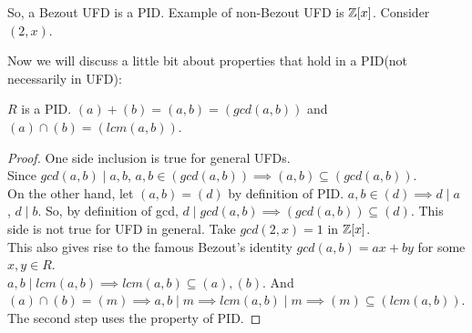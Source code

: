 So, a Bezout UFD is a PID. Example of non-Bezout UFD is $ \mathbb{Z}[x] $. Consider $ (2,x) $.

Now we will discuss a little bit about properties that hold in a PID(not necessarily in UFD):
\begin{theorem}
	$ R $ is a PID. $ (a)+(b)=(a,b)= (gcd(a,b)) $ and $ (a)\cap(b)= (lcm(a,b)) $. 
\end{theorem}
\begin{proof}
	One side inclusion is true for general UFDs.\\
	Since $ gcd(a,b)\mid a,b $, $ a,b\in (gcd(a,b)) \implies (a,b)\subseteq (gcd(a,b)) $.\\
	On the other hand, let $ (a,b)=(d) $ by definition of PID. $ a,b\in (d) \implies d\mid a$ ,  $d\mid b $. So, by definition of gcd, $ d\mid gcd(a,b) \implies (gcd(a,b))\subseteq (d)$. This side is not true for UFD in general. Take $ gcd(2,x)=1 $ in $ \mathbb{Z}[x] $.\\
	This also gives rise to the famous Bezout's identity $ gcd(a,b)= ax+by $ for some $ x,y\in R $.\\
	$ a,b\mid lcm(a,b) \implies lcm(a,b)\subseteq (a), (b)$. And $ (a)\cap(b)=(m)\implies a,b\mid m  \implies lcm(a,b)\mid m \implies (m) \subseteq (lcm(a,b))$. The second step uses the property of PID.
\end{proof}
\newpage
